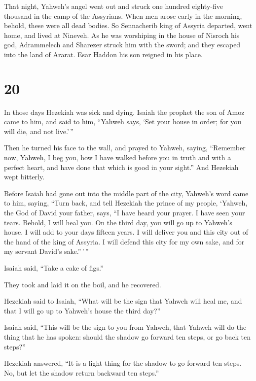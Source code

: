  That night, Yahweh's angel went out and struck one
hundred eighty-five thousand in the camp of the Assyrians. When men
arose early in the morning, behold, these were all dead bodies.
 So Sennacherib king of Assyria departed, went home, and
lived at Nineveh.  As he was worshiping in the house of
Nisroch his god, Adrammelech and Sharezer struck him with the sword; and
they escaped into the land of Ararat. Esar Haddon his son reigned in his
place.

\hypertarget{section-19}{%
\section{20}\label{section-19}}

 In those days Hezekiah was sick and dying. Isaiah the
prophet the son of Amoz came to him, and said to him, ``Yahweh says,
`Set your house in order; for you will die, and not live.'\,''

 Then he turned his face to the wall, and prayed to
Yahweh, saying,  ``Remember now, Yahweh, I beg you, how I
have walked before you in truth and with a perfect heart, and have done
that which is good in your sight.'' And Hezekiah wept bitterly.

 Before Isaiah had gone out into the middle part of the
city, Yahweh's word came to him, saying,  ``Turn back, and
tell Hezekiah the prince of my people, `Yahweh, the God of David your
father, says, ``I have heard your prayer. I have seen your tears.
Behold, I will heal you. On the third day, you will go up to Yahweh's
house.  I will add to your days fifteen years. I will
deliver you and this city out of the hand of the king of Assyria. I will
defend this city for my own sake, and for my servant David's
sake.''\,'\,''

 Isaiah said, ``Take a cake of figs.''

They took and laid it on the boil, and he recovered.

 Hezekiah said to Isaiah, ``What will be the sign that
Yahweh will heal me, and that I will go up to Yahweh's house the third
day?''

 Isaiah said, ``This will be the sign to you from Yahweh,
that Yahweh will do the thing that he has spoken: should the shadow go
forward ten steps, or go back ten steps?''

 Hezekiah answered, ``It is a light thing for the shadow
to go forward ten steps. No, but let the shadow return backward ten
steps.''

